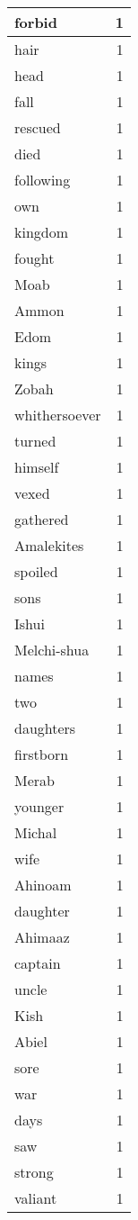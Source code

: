 \begin{center}
\begin{longtable}{l|r}
forbid & 1 \\ \hline
hair & 1 \\ \hline
head & 1 \\ \hline
fall & 1 \\ \hline
rescued & 1 \\ \hline
died & 1 \\ \hline
following & 1 \\ \hline
own & 1 \\ \hline
kingdom & 1 \\ \hline
fought & 1 \\ \hline
Moab & 1 \\ \hline
Ammon & 1 \\ \hline
Edom & 1 \\ \hline
kings & 1 \\ \hline
Zobah & 1 \\ \hline
whithersoever & 1 \\ \hline
turned & 1 \\ \hline
himself & 1 \\ \hline
vexed & 1 \\ \hline
gathered & 1 \\ \hline
Amalekites & 1 \\ \hline
spoiled & 1 \\ \hline
sons & 1 \\ \hline
Ishui & 1 \\ \hline
Melchi-shua & 1 \\ \hline
names & 1 \\ \hline
two & 1 \\ \hline
daughters & 1 \\ \hline
firstborn & 1 \\ \hline
Merab & 1 \\ \hline
younger & 1 \\ \hline
Michal & 1 \\ \hline
wife & 1 \\ \hline
Ahinoam & 1 \\ \hline
daughter & 1 \\ \hline
Ahimaaz & 1 \\ \hline
captain & 1 \\ \hline
uncle & 1 \\ \hline
Kish & 1 \\ \hline
Abiel & 1 \\ \hline
sore & 1 \\ \hline
war & 1 \\ \hline
days & 1 \\ \hline
saw & 1 \\ \hline
strong & 1 \\ \hline
valiant & 1 \\ \hline
\end{longtable}
\end{center}



